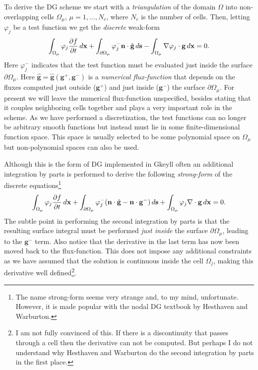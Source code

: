 \documentclass[11pt, reqno]{amsart}
\newcommand{\pfrac}[2]{\frac{\partial #1}{\partial #2}}
\newcommand{\mvec}[1]{\mathbf{#1}}
\theoremstyle{definition}
\begin{document}
To derive the DG scheme we start with a \emph{triangulation} of the
domain $\Omega$ into non-overlapping cells $\Omega_\mu$,
$\mu=1,\ldots,N_c$, where $N_c$ is the number of cells. Then, letting
$\varphi_j$ be a test function we get the \emph{discrete} weak-form
\begin{align}
  \int_{\Omega_\mu} \varphi_j \pfrac{f}{t}\thinspace d\mvec{x} +
  \int_{\partial \Omega_\mu}\varphi_j^-
  \mvec{n}\cdot\hat{\mvec{g}}\thinspace d\mvec{s} - \int_{\Omega_\mu}
  \nabla\varphi_j\cdot\mvec{g}\thinspace d\mvec{x} = 0.
\end{align}
Here $\varphi_j^-$ indicates that the test function must be evaluated
just inside the surface $\partial \Omega_\mu$. Here $\hat{\mvec{g}} =
\hat{\mvec{g}}(\mvec{g}^+,\mvec{g}^-)$ is a \emph{numerical
  flux-function} that depends on the fluxes computed just outside
($\mvec{g}^+$) and just inside ($\mvec{g}^-$) the surface $\partial
\Omega_\mu$.  For present we will leave the numerical flux-function
unspecified, besides stating that it couples neighboring cells
together and plays a very important role in the scheme. As we have
performed a discretization, the test functions can no longer be
arbitrary smooth functions but instead must lie in some
finite-dimensional function space. This space is usually selected to
be some polynomial space on $\Omega_\mu$ but non-polynomial spaces can
also be used.

Although this is the form of DG implemented in Gkeyll often an
additional integration by parts is performed to derive the following
\emph{strong-form} of the discrete equations\footnote{The name
  strong-form seems very strange and, to my mind,
  unfortunate. However, it is made popular with the nodal DG textbook
  by Hesthaven and Warburton.}
\begin{align}
  \int_{\Omega_\mu} \varphi_j \pfrac{f}{t}\thinspace d\mvec{x} +
  \int_{\partial \Omega_\mu}\varphi_j^- 
  (\mvec{n}\cdot\hat{\mvec{g}}-\mvec{n}\cdot\mvec{g}^-)\thinspace
  d\mvec{s} 
  + \int_{\Omega_\mu} \varphi_j\nabla\cdot\mvec{g}\thinspace
  d\mvec{x} = 0.  
\end{align}
The subtle point in performing the second integration by parts is that
the resulting surface integral must be performed \emph{just inside}
the surface $\partial\Omega_\mu$, leading to the $\mvec{g}^-$
term. Also notice that the derivative in the last term has now been
moved back to the flux-function. This does not impose any additional
constraints as we have assumed that the solution is continuous inside
the cell $\Omega_j$, making this derivative well defined\footnote{I am
  not fully convinced of this. If there is a discontinuity that passes
  through a cell then the derivative can not be computed. But perhaps
  I do not understand why Hesthaven and Warburton do the second
  integration by parts in the first place.}.
\end{document}

